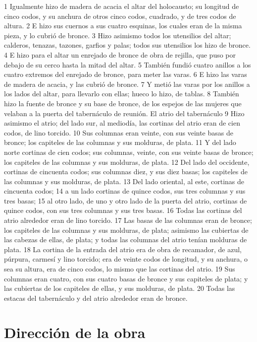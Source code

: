 1 Igualmente hizo de madera de acacia el altar del holocausto; su longitud de cinco codos, y su anchura de otros cinco codos, cuadrado, y de tres codos de altura.
2 E hizo sus cuernos a sus cuatro esquinas, los cuales eran de la misma pieza, y lo cubrió de bronce.
3 Hizo asimismo todos los utensilios del altar; calderos, tenazas, tazones, garfios y palas; todos sus utensilios los hizo de bronce.
4 E hizo para el altar un enrejado de bronce de obra de rejilla, que puso por debajo de su cerco hasta la mitad del altar.
5 También fundió cuatro anillos a los cuatro extremos del enrejado de bronce, para meter las varas.
6 E hizo las varas de madera de acacia, y las cubrió de bronce.
7 Y metió las varas por los anillos a los lados del altar, para llevarlo con ellas; hueco lo hizo, de tablas.
8 También hizo la fuente de bronce y su base de bronce, de los espejos de las mujeres que velaban a la puerta del tabernáculo de reunión.
El atrio del tabernáculo
9 Hizo asimismo el atrio; del lado sur, al mediodía, las cortinas del atrio eran de cien codos, de lino torcido.
10 Sus columnas eran veinte, con sus veinte basas de bronce; los capiteles de las columnas y sus molduras, de plata.
11 Y del lado norte cortinas de cien codos;  sus columnas, veinte, con sus veinte basas de bronce; los capiteles de las columnas y sus molduras, de plata.
12 Del lado del occidente, cortinas de cincuenta codos;  sus columnas diez, y sus diez basas; los capiteles de las columnas y sus molduras, de plata.
13 Del lado oriental, al este, cortinas de cincuenta codos;
14 a un lado cortinas de quince codos,  sus tres columnas y sus tres basas;
15 al otro lado, de uno y otro lado de la puerta del atrio, cortinas de quince codos,  con sus tres columnas y sus tres basas.
16 Todas las cortinas del atrio alrededor eran de lino torcido.
17 Las basas de las columnas eran de bronce; los capiteles de las columnas y sus molduras, de plata; asimismo las cubiertas de las cabezas de ellas, de plata; y todas las columnas del atrio tenían molduras de plata.
18 La cortina de la entrada del atrio era de obra de recamador, de azul, púrpura, carmesí y lino torcido; era de veinte codos   de longitud, y su anchura, o sea su altura, era de cinco codos, lo mismo que las cortinas del atrio.
19 Sus columnas eran cuatro, con sus cuatro basas de bronce y sus capiteles de plata; y las cubiertas de los capiteles de ellas, y sus molduras, de plata.
20 Todas las estacas del tabernáculo y del atrio alrededor eran de bronce.

\section*{Dirección de la obra}


